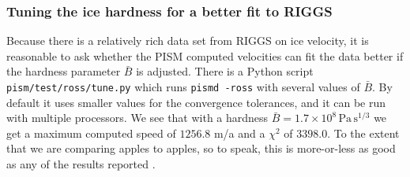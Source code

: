 \documentclass[11pt,final]{amsart}
\begin{document}
\subsubsection{Tuning the ice hardness for a better fit to RIGGS}  Because there is a relatively rich data set from RIGGS on ice velocity, it is reasonable to ask whether the PISM computed velocities can fit the data better if the hardness parameter $\bar B$ is adjusted.  There is a Python script \verb|pism/test/ross/tune.py| which runs \verb|pismd -ross| with several values of $\bar B$.  By default it uses smaller values for the convergence tolerances, and it can be run with multiple processors.  We see that with a hardness $\bar B = 1.7 \times 10^8 \, \text{Pa}\, \text{s}^{1/3}$ we get a maximum computed speed of $1256.8$ m/a and a $\chi^2$ of $3398.0$.  To the extent that we are comparing apples to apples, so to speak, this is more-or-less as good as any of the results reported \cite{MacAyealetal}.
\end{document}
